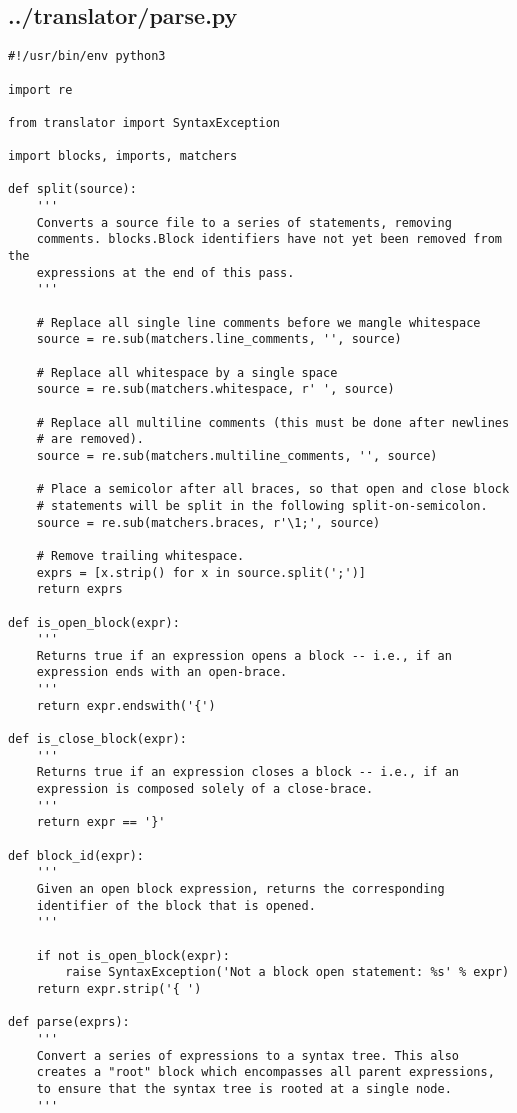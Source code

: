 \subsection*{../translator/parse.py}
\begin{lstlisting}
#!/usr/bin/env python3

import re

from translator import SyntaxException

import blocks, imports, matchers

def split(source):
    '''
    Converts a source file to a series of statements, removing
    comments. blocks.Block identifiers have not yet been removed from the
    expressions at the end of this pass.
    '''

    # Replace all single line comments before we mangle whitespace
    source = re.sub(matchers.line_comments, '', source)

    # Replace all whitespace by a single space
    source = re.sub(matchers.whitespace, r' ', source)

    # Replace all multiline comments (this must be done after newlines
    # are removed).
    source = re.sub(matchers.multiline_comments, '', source)

    # Place a semicolor after all braces, so that open and close block
    # statements will be split in the following split-on-semicolon.
    source = re.sub(matchers.braces, r'\1;', source)

    # Remove trailing whitespace.
    exprs = [x.strip() for x in source.split(';')]
    return exprs
        
def is_open_block(expr):
    '''
    Returns true if an expression opens a block -- i.e., if an
    expression ends with an open-brace.
    '''
    return expr.endswith('{')

def is_close_block(expr):
    '''
    Returns true if an expression closes a block -- i.e., if an
    expression is composed solely of a close-brace.
    '''
    return expr == '}'

def block_id(expr):
    '''
    Given an open block expression, returns the corresponding
    identifier of the block that is opened.
    '''

    if not is_open_block(expr):
        raise SyntaxException('Not a block open statement: %s' % expr)
    return expr.strip('{ ')

def parse(exprs):
    '''
    Convert a series of expressions to a syntax tree. This also
    creates a "root" block which encompasses all parent expressions,
    to ensure that the syntax tree is rooted at a single node.
    '''


\end{lstlisting}
